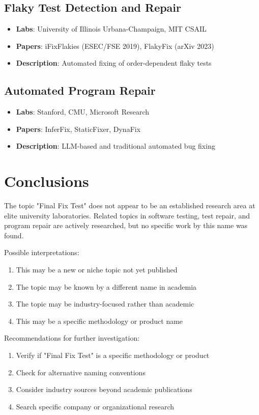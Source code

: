 \documentclass[12pt,a4paper]{article}
\begin{document}
\subsection{Flaky Test Detection and Repair}

\begin{itemize}
    \item \textbf{Labs}: University of Illinois Urbana-Champaign, MIT CSAIL
    \item \textbf{Papers}: iFixFlakies (ESEC/FSE 2019), FlakyFix (arXiv 2023)
    \item \textbf{Description}: Automated fixing of order-dependent flaky tests
\end{itemize}

\subsection{Automated Program Repair}

\begin{itemize}
    \item \textbf{Labs}: Stanford, CMU, Microsoft Research
    \item \textbf{Papers}: InferFix, StaticFixer, DynaFix
    \item \textbf{Description}: LLM-based and traditional automated bug fixing
\end{itemize}

\section{Conclusions}

The topic "Final Fix Test" does not appear to be an established research area at elite university laboratories. Related topics in software testing, test repair, and program repair are actively researched, but no specific work by this name was found.

Possible interpretations:
\begin{enumerate}
    \item This may be a new or niche topic not yet published
    \item The topic may be known by a different name in academia
    \item The topic may be industry-focused rather than academic
    \item This may be a specific methodology or product name
\end{enumerate}

Recommendations for further investigation:
\begin{enumerate}
    \item Verify if "Final Fix Test" is a specific methodology or product
    \item Check for alternative naming conventions
    \item Consider industry sources beyond academic publications
    \item Search specific company or organizational research
\end{enumerate}
\end{document}
